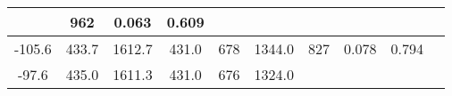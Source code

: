 \documentclass[a4paper,10pt]{article}
\begin{document}
\begin{longtable}{
     |
%    
    c|
%    
    c|
%    
    c|
%    
    c|
%    
    c|
%    
    c|
%    
    c|
%    
    c|
%    
    c|
%    
    c|
%    
    }
%        
        & 962
%        

%        

%        
        & 0.063
%        

%        

%        
        & 0.609
%        

%        
        \\
        \hline

        

%        

%        
        -105.6
%        

%        

%        
        & 433.7
%        

%        

%        
        & 1612.7
%        

%        

%        
        & 431.0
%        

%        

%        
        & 678
%        

%        

%        
        & 1344.0
%        

%        

%        
        & 827
%        

%        

%        
        & 0.078
%        

%        

%        
        & 0.794
%        

%        
        \\
        \hline

        

%        

%        
        -97.6
%        

%        

%        
        & 435.0
%        

%        

%        
        & 1611.3
%        

%        

%        
        & 431.0
%        

%        

%        
        & 676
%        

%        

%        
        & 1324.0
%        

%        


\end{longtable}
\end{document}
